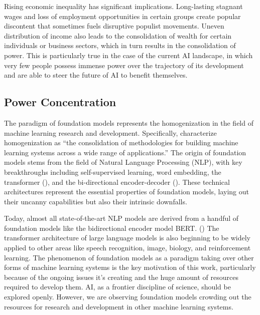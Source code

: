 \documentclass[12pt]{article}
\begin{document}
Rising economic inequality has significant implications. Long-lasting stagnant wages and loss of employment opportunities in certain groups create popular discontent that sometimes fuels disruptive populist movements. Uneven distribution of income also leads to the consolidation of wealth for certain individuals or business sectors, which in turn results in the consolidation of power. This is particularly true in the case of the current AI landscape, in which very few people possess immense power over the trajectory of its development and are able to steer the future of AI to benefit themselves. 

\subsection{Power Concentration}
The paradigm of foundation models represents the homogenization in the field of machine learning research and development. Specifically, \cite{bommasani2022opportunitiesrisksfoundationmodels} characterize homogenization as ``the consolidation of methodologies for building machine learning systems across a wide range of applications.'' The origin of foundation models stems from the field of Natural Language Processing (NLP), with key breakthroughs including self-supervised learning, word embedding, the transformer (\cite{vaswani2023attentionneed}), and the bi-directional encoder-decoder (\cite{devlin2019bertpretrainingdeepbidirectional}). These technical architectures represent the essential properties of foundation models, laying out their uncanny capabilities but also their intrinsic downfalls.

Today, almost all state-of-the-art NLP models are derived from a handful of foundation models like the bidirectional encoder model BERT. (\cite{bommasani2022opportunitiesrisksfoundationmodels}) The transformer architecture of large language models is also beginning to be widely applied to other areas like speech recognition, image, biology, and reinforcement learning. The phenomenon of foundation models as a paradigm taking over other forms of machine learning systems is the key motivation of this work, particularly because of the ongoing issues it's creating and the huge amount of resources required to develop them. AI, as a frontier discipline of science, should be explored openly. However, we are observing foundation models crowding out the resources for research and development in other machine learning systems. 
\end{document}

